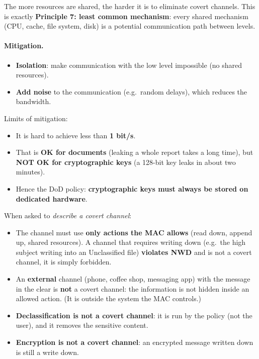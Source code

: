 \begin{remark}
The more resources are shared, the harder it is to eliminate covert channels. This is exactly \textbf{Principle 7: least common mechanism}: every shared mechanism (CPU, cache, file system, disk) is a potential communication path between levels.
\end{remark}

\paragraph{Mitigation.}
\begin{itemize}
    \item \textbf{Isolation}: make communication with the low level impossible (no shared resources).
    \item \textbf{Add noise} to the communication (e.g.\ random delays), which reduces the bandwidth.
\end{itemize}
Limits of mitigation:
\begin{itemize}
    \item It is hard to achieve less than \textbf{1 bit/s}.
    \item That is \textbf{OK for documents} (leaking a whole report takes a long time), but \textbf{NOT OK for cryptographic keys} (a 128-bit key leaks in about two minutes).
    \item Hence the DoD policy: \textbf{cryptographic keys must always be stored on dedicated hardware}.
\end{itemize}

\begin{remark}
When asked to \emph{describe a covert channel}:
\begin{itemize}
    \item The channel must use \textbf{only actions the MAC allows} (read down, append up, shared resources). A channel that requires writing down (e.g.\ the high subject writing into an Unclassified file) \textbf{violates NWD} and is not a covert channel, it is simply forbidden.
    \item An \textbf{external} channel (phone, coffee shop, messaging app) with the message in the clear is \textbf{not} a covert channel: the information is not hidden inside an allowed action. (It is outside the system the MAC controls.)
    \item \textbf{Declassification is not a covert channel}: it is run by the policy (not the user), and it removes the sensitive content.
    \item \textbf{Encryption is not a covert channel}: an encrypted message written down is still a write down.
\end{itemize}
\end{remark}

